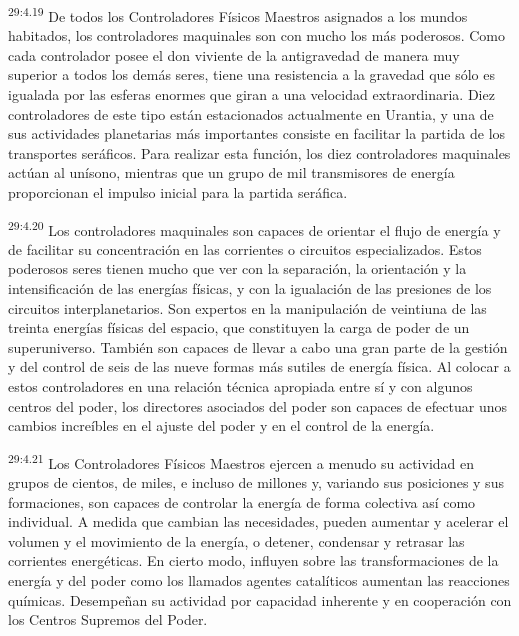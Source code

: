 \par
\textsuperscript{29:4.19} De todos los Controladores Físicos Maestros asignados a los mundos habitados, los controladores maquinales son con mucho los más poderosos. Como cada controlador posee el don viviente de la antigravedad de manera muy superior a todos los demás seres, tiene una resistencia a la gravedad que sólo es igualada por las esferas enormes que giran a una velocidad extraordinaria. Diez controladores de este tipo están estacionados actualmente en Urantia, y una de sus actividades planetarias más importantes consiste en facilitar la partida de los transportes seráficos. Para realizar esta función, los diez controladores maquinales actúan al unísono, mientras que un grupo de mil transmisores de energía proporcionan el impulso inicial para la partida seráfica.

\par
\textsuperscript{29:4.20} Los controladores maquinales son capaces de orientar el flujo de energía y de facilitar su concentración en las corrientes o circuitos especializados. Estos poderosos seres tienen mucho que ver con la separación, la orientación y la intensificación de las energías físicas, y con la igualación de las presiones de los circuitos interplanetarios. Son expertos en la manipulación de veintiuna de las treinta energías físicas del espacio, que constituyen la carga de poder de un superuniverso. También son capaces de llevar a cabo una gran parte de la gestión y del control de seis de las nueve formas más sutiles de energía física. Al colocar a estos controladores en una relación técnica apropiada entre sí y con algunos centros del poder, los directores asociados del poder son capaces de efectuar unos cambios increíbles en el ajuste del poder y en el control de la energía.

\par
\textsuperscript{29:4.21} Los Controladores Físicos Maestros ejercen a menudo su actividad en grupos de cientos, de miles, e incluso de millones y, variando sus posiciones y sus formaciones, son capaces de controlar la energía de forma colectiva así como individual. A medida que cambian las necesidades, pueden aumentar y acelerar el volumen y el movimiento de la energía, o detener, condensar y retrasar las corrientes energéticas. En cierto modo, influyen sobre las transformaciones de la energía y del poder como los llamados agentes catalíticos aumentan las reacciones químicas. Desempeñan su actividad por capacidad inherente y en cooperación con los Centros Supremos del Poder.

